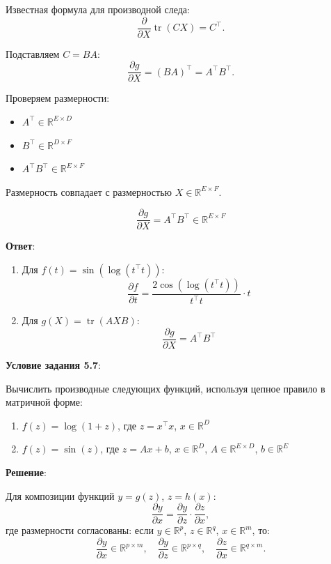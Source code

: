 \documentclass[pract]{SCWorks}
\begin{document}
    Известная формула для производной следа:
    \[
    \frac{\partial}{\partial X} \operatorname{tr}(CX) = C^\top.
    \]

    Подставляем $C = BA$:
    \[
    \frac{\partial g}{\partial X} = (BA)^\top = A^\top B^\top.
    \]

    Проверяем размерности:
    \begin{itemize}
        \item[$\bullet$] $A^\top \in \mathbb{R}^{E \times D}$
        \item[$\bullet$] $B^\top \in \mathbb{R}^{D \times F}$
        \item[$\bullet$] $A^\top B^\top \in \mathbb{R}^{E \times F}$
    \end{itemize}

    Размерность совпадает с размерностью $X \in \mathbb{R}^{E \times F}$.

    \[
    \boxed{\dfrac{\partial g}{\partial X} = A^\top B^\top \in \mathbb{R}^{E \times F}}
    \]

    \textbf{Ответ}:
    \begin{enumerate}
        \item Для $f(t) = \sin(\log(t^\top t))$:
        \[
        \boxed{\dfrac{\partial f}{\partial t} = \dfrac{2\cos\left(\log(t^\top t)\right)}{t^\top t} \cdot t}
        \]

        \item Для $g(X) = \operatorname{tr}(AXB)$:
        \[
        \boxed{\dfrac{\partial g}{\partial X} = A^\top B^\top}
        \]
    \end{enumerate}

    \textbf{Условие задания 5.7}:

    Вычислить производные следующих функций, используя цепное правило в матричной форме:
    \begin{enumerate}[label=\alph*)]
        \item $f(z) = \log(1 + z)$, где $z = x^\top x$, $x \in \mathbb{R}^D$
        \item $f(z) = \sin(z)$, где $z = Ax + b$, $x \in \mathbb{R}^D$, $A \in \mathbb{R}^{E \times D}$, $b \in \mathbb{R}^E$
    \end{enumerate}

    \textbf{Решение}:

    Для композиции функций $y = g(z)$, $z = h(x)$:
    \[
    \frac{\partial y}{\partial x} = \frac{\partial y}{\partial z} \cdot \frac{\partial z}{\partial x},
    \]
    где размерности согласованы: если $y \in \mathbb{R}^p$, $z \in \mathbb{R}^q$, $x \in \mathbb{R}^m$, то:
    \[
    \frac{\partial y}{\partial x} \in \mathbb{R}^{p \times m}, \quad
    \frac{\partial y}{\partial z} \in \mathbb{R}^{p \times q}, \quad
    \frac{\partial z}{\partial x} \in \mathbb{R}^{q \times m}.
    \]
\end{document}
